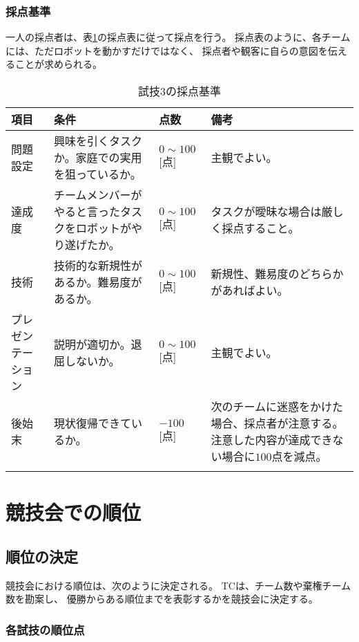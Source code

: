 \documentclass[a4j]{jarticle}
\def\thline{\noalign{\hrule height 1pt}}
\begin{document}
\subsubsection{採点基準}

一人の採点者は、表\ref{table:test3score}の採点表に従って採点を行う。
採点表のように、各チームには、ただロボットを動かすだけではなく、
採点者や観客に自らの意図を伝えることが求められる。


\begin{table}
\begin{center}
\caption{試技3の採点基準}
\label{table:test3score}
\begin{tabular}{l|p{4cm}|l|p{4cm}}
\thline
項目 & 条件 & 点数 & 備考\\
\hline
問題設定 & 興味を引くタスクか。家庭での実用を狙っているか。 & $0\sim100$[点] & 主観でよい。\\
達成度 & チームメンバーがやると言ったタスクをロボットがやり遂げたか。 & $0\sim100$[点] & タスクが曖昧な場合は厳しく採点すること。 \\
技術 & 技術的な新規性があるか。難易度があるか。 & $0\sim100$[点]  & 新規性、難易度のどちらかがあればよい。\\
プレゼンテーション & 説明が適切か。退屈しないか。 & $0\sim100$[点] & 主観でよい。\\
後始末 & 現状復帰できているか。 & $-100$[点] & 次のチームに迷惑をかけた場合、採点者が注意する。注意した内容が達成できない場合に$100$点を減点。\\
\thline
\end{tabular}
\end{center}
\end{table}



\section{競技会での順位}

\subsection{順位の決定}

競技会における順位は、次のように決定される。
TCは、チーム数や棄権チーム数を勘案し、
優勝からある順位までを表彰するかを競技会に決定する。

\subsubsection{各試技の順位点}
\end{document}
